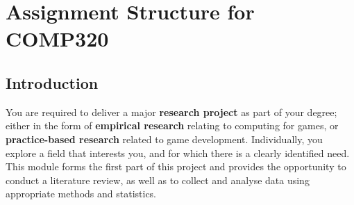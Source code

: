 \chapter{Assignment Structure for COMP320}

\section*{Introduction}

You are required to deliver a major \textbf{research project} as part of your degree; either in the form of \textbf{empirical research} relating to computing for games, or \textbf{practice-based research} related to game development. Individually, you explore a field that interests you, and for which there is a clearly identified need. This module forms the first part of this project and provides the opportunity to conduct a literature review, as well as to collect and analyse data using appropriate methods and statistics.

